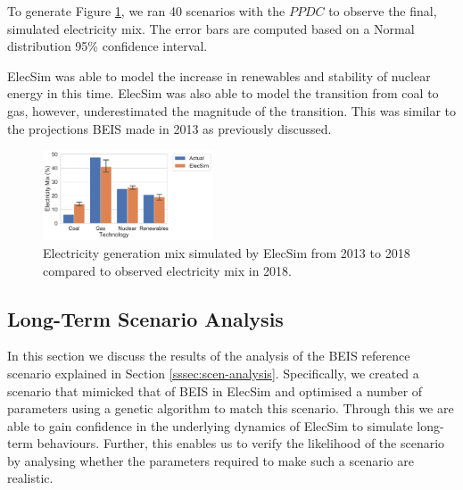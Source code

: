 To generate Figure \ref{fig:uk_validated_results_2018}, we ran 40 scenarios with the $PPDC$ to observe the final, simulated electricity mix. The error bars are computed based on a Normal distribution 95\% confidence interval.

ElecSim was able to model the increase in renewables and stability of nuclear energy in this time. ElecSim was also able to model the transition from coal to gas, however, underestimated the magnitude of the transition. This was similar to the projections BEIS made in 2013 as previously discussed.

\begin{figure}
	\centering
	\includegraphics[width=0.45\textwidth]{Chapter4/figures/e-Energy-2020/results/best_run_coal_dropout_95_ci.pdf}
	\caption{Electricity generation mix simulated by ElecSim from 2013 to 2018 compared to observed electricity mix in 2018.}
	\label{fig:uk_validated_results_2018}
\end{figure}








\subsection{Long-Term Scenario Analysis}

In this section we discuss the results of the analysis of the BEIS reference scenario explained in Section \ref{sssec:scen-analysis}. Specifically, we created a scenario that mimicked that of BEIS in ElecSim and optimised a number of parameters using a genetic algorithm to match this scenario. Through this we are able to gain confidence in the underlying dynamics of ElecSim to simulate long-term behaviours. Further, this enables us to verify the likelihood of the scenario by analysing whether the parameters required to make such a scenario are realistic.

